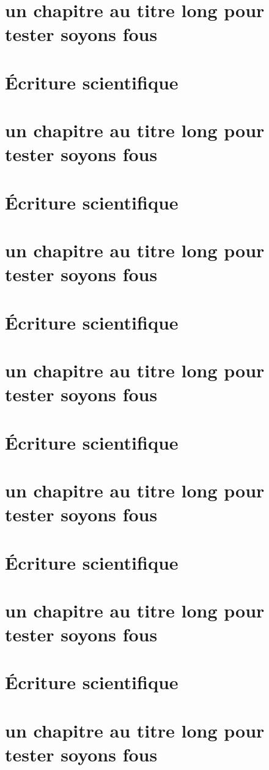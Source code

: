 \documentclass[a4paper, 11pt, twoside, fleqn]{memoir}
\begin{document}
\frontmatter
\chapter{un chapitre au titre long pour tester soyons fous}
\mainmatter
\chapter{\'Ecriture scientifique}
\chapter{un chapitre au titre long pour tester soyons fous}
\chapter{\'Ecriture scientifique}
\chapter{un chapitre au titre long pour tester soyons fous}
\chapter{\'Ecriture scientifique}
\chapter{un chapitre au titre long pour tester soyons fous}
\chapter{\'Ecriture scientifique}
\chapter{un chapitre au titre long pour tester soyons fous}
\chapter{\'Ecriture scientifique}
\chapter{un chapitre au titre long pour tester soyons fous}
\appendix
\chapter{\'Ecriture scientifique}
\chapter{un chapitre au titre long pour tester soyons fous}
\end{document}
